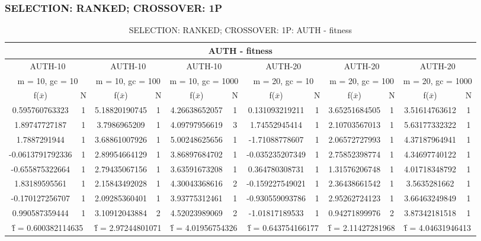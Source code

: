 \subsubsection{SELECTION: RANKED; CROSSOVER: 1P}
\begin{table}[H]
	\centering
	\caption{SELECTION: RANKED; CROSSOVER: 1P: AUTH - fitness}
	\begin{adjustbox}{width=1\textwidth}
		\begin{tabular}{ |c|c||c|c||c|c||c|c||c|c||c|c| }
			\hline
			\multicolumn{12}{|c|}{AUTH - fitness} \\
			\hline
			\multicolumn{2}{|c||}{AUTH-10} & \multicolumn{2}{c||}{AUTH-10} & \multicolumn{2}{c||}{AUTH-10} & \multicolumn{2}{c||}{AUTH-20} & \multicolumn{2}{c||}{AUTH-20} & \multicolumn{2}{c|}{AUTH-20}\\
			\hline
			\multicolumn{2}{|c||}{m = 10, gc = 10} & \multicolumn{2}{c||}{m = 10, gc = 100} & \multicolumn{2}{c||}{m = 10, gc = 1000} & \multicolumn{2}{c||}{m = 20, gc = 10} & \multicolumn{2}{c||}{m = 20, gc = 100} & \multicolumn{2}{c|}{m = 20, gc = 1000}\\
			\hline
			f($\bar{x}$) & N & f($\bar{x}$) & N & f($\bar{x}$) & N & f($\bar{x}$) & N & f($\bar{x}$) & N & f($\bar{x}$) & N\\
			\hline
			\hline
			0.595760763323 & 1 & 5.18820190745 & 1 & 4.26638652057 & 1 & 0.131093219211 & 1 & 3.65251684505 & 1 & 3.51614763612 & 1\\
			1.89747727187 & 1 & 3.7986965209 & 1 & 4.09797956619 & 3 & 1.74552945414 & 1 & 2.10703567013 & 1 & 5.63177332322 & 1\\
			1.7887291944 & 1 & 3.68861007926 & 1 & 5.00248625656 & 1 & -1.71088778607 & 1 & 2.06572727993 & 1 & 4.37187964941 & 1\\
			-0.0613791792336 & 1 & 2.89954664129 & 1 & 3.86897684702 & 1 & -0.035235207349 & 1 & 2.75852398774 & 1 & 4.34697740122 & 1\\
			-0.655875322664 & 1 & 2.79435067156 & 1 & 3.63591673208 & 1 & 0.364780308731 & 1 & 1.31576206748 & 1 & 4.01718348792 & 1\\
			1.83189595561 & 1 & 2.15843492028 & 1 & 4.30043368616 & 2 & -0.159227549021 & 1 & 2.36438661542 & 1 & 3.5635281662 & 1\\
			-0.170127256707 & 1 & 2.09285360401 & 1 & 3.93775312461 & 1 & -0.930559093786 & 1 & 2.95262724123 & 1 & 3.66463249849 & 1\\
			0.990587359444 & 1 & 3.10912043884 & 2 & 4.52023989069 & 2 & -1.01817189533 & 1 & 0.94271899976 & 2 & 3.87342181518 & 1\\
			\hline
			\multicolumn{2}{|c||}{\^{f} = 0.600382114635} & \multicolumn{2}{c||}{\^{f} = 2.97244801071} & \multicolumn{2}{c||}{\^{f} = 4.01956754326} & \multicolumn{2}{c||}{\^{f} = 0.643754166177} & \multicolumn{2}{c||}{\^{f} = 2.11427281968} & \multicolumn{2}{c|}{\^{f} = 4.04631946413}\\
			\hline
		\end{tabular}
	\end{adjustbox}
\end{table}
